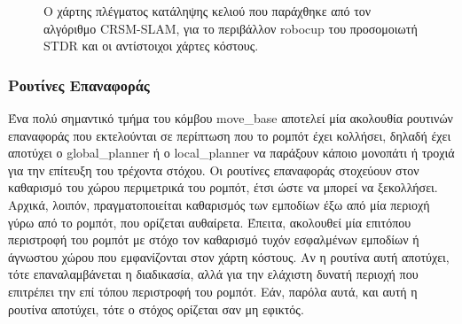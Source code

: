 \begin{figure}[!ht]
	\centering
	\caption{Ο χάρτης πλέγματος κατάληψης κελιού που παράχθηκε από τον αλγόριθμο CRSM-SLAM, για το περιβάλλον robocup του προσομοιωτή STDR και οι αντίστοιχοι χάρτες κόστους.}
	\label{fig:costmaps}
\end{figure}


\subsubsection{Ρουτίνες Επαναφοράς}
Ένα πολύ σημαντικό τμήμα του κόμβου move{\_}base αποτελεί μία ακολουθία ρουτινών επαναφοράς που εκτελούνται σε περίπτωση που το ρομπότ έχει κολλήσει, δηλαδή έχει αποτύχει ο global{\_}planner ή ο local{\_}planner να παράξουν κάποιο μονοπάτι ή τροχιά για την επίτευξη του τρέχοντα στόχου. Οι ρουτίνες επαναφοράς στοχεύουν στον καθαρισμό του χώρου περιμετρικά του ρομπότ, έτσι ώστε να μπορεί να ξεκολλήσει. Αρχικά, λοιπόν, πραγματοποιείται καθαρισμός των εμποδίων έξω από μία περιοχή γύρω από το ρομπότ, που ορίζεται αυθαίρετα. Έπειτα, ακολουθεί μία επιτόπου περιστροφή του ρομπότ με στόχο τον καθαρισμό τυχόν εσφαλμένων εμποδίων ή άγνωστου χώρου που εμφανίζονται στον χάρτη κόστους. Αν η ρουτίνα αυτή αποτύχει, τότε επαναλαμβάνεται η διαδικασία, αλλά για την ελάχιστη δυνατή περιοχή που επιτρέπει την επί τόπου περιστροφή του ρομπότ. Εάν, παρόλα αυτά, και αυτή η ρουτίνα αποτύχει, τότε ο στόχος ορίζεται σαν μη εφικτός.

